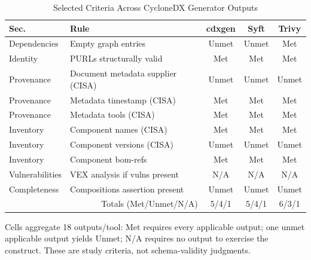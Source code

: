 \FloatBarrier

\vspace{-1.4em}

\begin{table}[H]
\centering
\tiny
\caption{Selected Criteria Across CycloneDX Generator Outputs}
\vspace{-1.4em}
\label{tab:cdx-schema-gap}
\begin{tabular}{llccc}
\toprule
Sec. & Rule & cdxgen & Syft & Trivy \\
\midrule
Dependencies & Empty graph entries                 & Unmet & Unmet & Met \\
Identity     & PURLs structurally valid            & Met & Met & Met \\
Provenance   & Document metadata supplier (CISA)   & Unmet & Unmet & Unmet \\
Provenance   & Metadata timestamp (CISA)           & Met & Met & Met \\
Provenance   & Metadata tools (CISA)               & Met & Met & Met \\
Inventory    & Component names (CISA)              & Met & Met & Met \\
Inventory    & Component versions (CISA)           & Unmet & Unmet & Unmet \\
Inventory    & Component bom-refs                  & Met & Met & Met \\
Vulnerabilities & VEX analysis if vulns present  & N/A  & N/A  & N/A  \\
Completeness & Compositions assertion present      & Unmet & Unmet & Unmet \\
\midrule
\multicolumn{2}{r}{Totals (Met/Unmet/N/A)} & 5/4/1 & 5/4/1 & 6/3/1 \\
\bottomrule
\end{tabular}
\par\smallskip
{\scriptsize Cells aggregate 18 outputs/tool: Met requires every applicable output; one unmet applicable output yields Unmet; N/A requires no output to exercise the construct. These are study criteria, not schema-validity judgments.}
\end{table}
